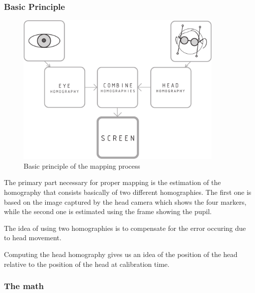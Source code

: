 \subsubsection{Basic Principle}
\begin{figure}[H]
  \centering
  \includegraphics[width=0.9\textwidth]{../finalpres/01c.pdf}
  \caption{Basic principle of the mapping process}\label{fig:basic}
\end{figure}
The primary part necessary for proper mapping is the estimation of the homography that consists basically of two different homographies. 
The first one is based on the image captured by the head camera which shows the four markers, while the second one is estimated using the frame showing the pupil.

The idea of using two homographies is to compensate for the error occuring due to head movement.

Computing the head homography gives us an idea of the position of the head relative to the position of the head at calibration time. 



\subsubsection{The math}

